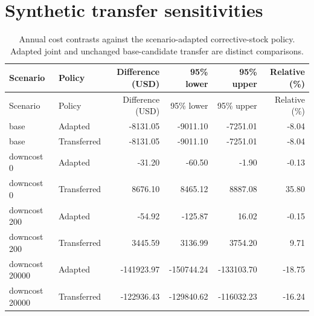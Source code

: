 \section{Synthetic transfer sensitivities}

\begin{small}

\setlength{\tabcolsep}{4pt}

\begin{longtable}{llrrrr}

\caption{Annual cost contrasts against the scenario-adapted corrective-stock policy. Adapted joint and unchanged base-candidate transfer are distinct comparisons.}\label{tab:s-joint-sensitivity}\\

\toprule

Scenario & Policy & Difference (USD) & 95\% lower & 95\% upper & Relative (\%) \\

\midrule

\endfirsthead

\toprule

Scenario & Policy & Difference (USD) & 95\% lower & 95\% upper & Relative (\%) \\

\midrule

\endhead

base & Adapted & -8131.05 & -9011.10 & -7251.01 & -8.04 \\

base & Transferred & -8131.05 & -9011.10 & -7251.01 & -8.04 \\

downcost 0 & Adapted & -31.20 & -60.50 & -1.90 & -0.13 \\

downcost 0 & Transferred & 8676.10 & 8465.12 & 8887.08 & 35.80 \\

downcost 200 & Adapted & -54.92 & -125.87 & 16.02 & -0.15 \\

downcost 200 & Transferred & 3445.59 & 3136.99 & 3754.20 & 9.71 \\

downcost 20000 & Adapted & -141923.97 & -150744.24 & -133103.70 & -18.75 \\

downcost 20000 & Transferred & -122936.43 & -129840.62 & -116032.23 & -16.24 \\


\end{longtable}
\end{small}

